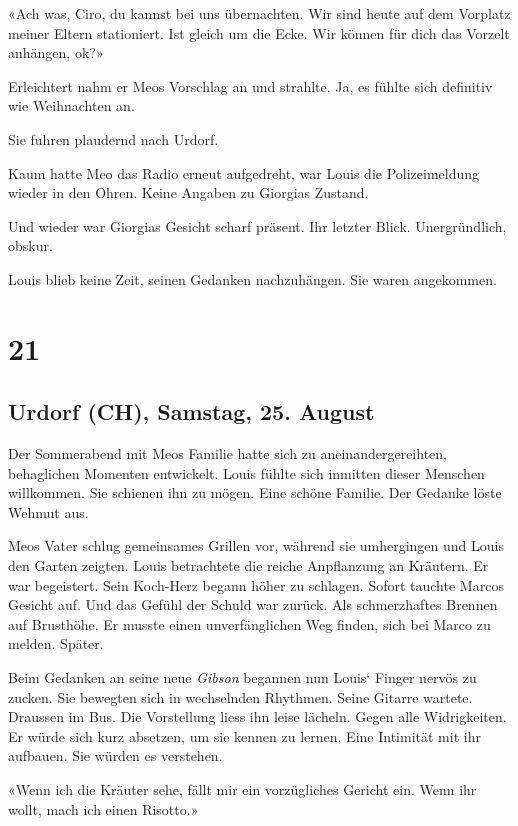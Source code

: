 «Ach was, Ciro, du kannst bei uns übernachten. Wir sind heute auf dem
Vorplatz meiner Eltern stationiert. Ist gleich um die Ecke. Wir können
für dich das Vorzelt anhängen, ok?»

Erleichtert nahm er Meos Vorschlag an und strahlte. Ja, es fühlte sich
definitiv wie Weihnachten an.

Sie fuhren plaudernd nach Urdorf.

Kaum hatte Meo das Radio erneut aufgedreht, war Louis die Polizeimeldung
wieder in den Ohren. Keine Angaben zu Giorgias Zustand.

Und wieder war Giorgias Gesicht scharf präsent. Ihr letzter Blick.
Unergründlich, obskur.

Louis blieb keine Zeit, seinen Gedanken nachzuhängen. Sie waren
angekommen.

\chapter{21}\label{section-20}

\section{Urdorf (CH), Samstag, 25.
August}\label{urdorf-ch-samstag-25.-august}

Der Sommerabend mit Meos Familie hatte sich zu aneinandergereihten,
behaglichen Momenten entwickelt. Louis fühlte sich inmitten dieser
Menschen willkommen. Sie schienen ihn zu mögen. Eine schöne Familie. Der
Gedanke löste Wehmut aus.

Meos Vater schlug gemeinsames Grillen vor, während sie umhergingen und
Louis den Garten zeigten. Louis betrachtete die reiche Anpflanzung an
Kräutern. Er war begeistert. Sein Koch-Herz begann höher zu schlagen.
Sofort tauchte Marcos Gesicht auf. Und das Gefühl der Schuld war zurück.
Als schmerzhaftes Brennen auf Brusthöhe. Er musste einen unverfänglichen
Weg finden, sich bei Marco zu melden. Später.

Beim Gedanken an seine neue \emph{Gibson} begannen nun Louis` Finger
nervös zu zucken. Sie bewegten sich in wechselnden Rhythmen. Seine
Gitarre wartete. Draussen im Bus. Die Vorstellung liess ihn leise
lächeln. Gegen alle Widrigkeiten. Er würde sich kurz absetzen, um sie
kennen zu lernen. Eine Intimität mit ihr aufbauen. Sie würden es
verstehen.

«Wenn ich die Kräuter sehe, fällt mir ein vorzügliches Gericht ein. Wenn
ihr wollt, mach ich einen Risotto.»

